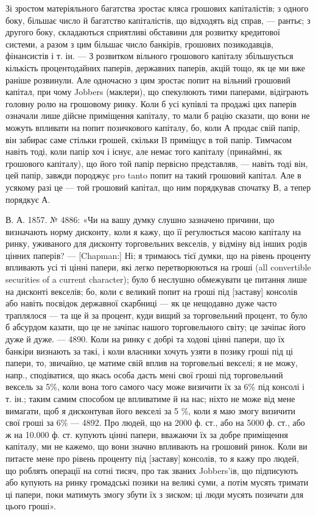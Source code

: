 Зі зростом матеріяльного багатства зростає кляса грошових капіталістів;
з одного боку, більшає число й багатство капіталістів, що відходять від справ, —
рантьє; з другого боку, складаються сприятливі обставини для розвитку кредитової
системи, а разом з цим більшає число банкірів, грошових позикодавців, фінансистів
і т. ін. — З розвитком вільного грошового капіталу збільшується кількість
процентодайних паперів, державних паперів, акцій тощо, як це ми вже раніше
розвинули. Але одночасно з цим зростає попит на вільний грошовий капітал, при
чому Jobbers (маклери), що спекулюють тими паперами, відіграють головну ролю на
грошовому ринку. Коли б усі купівлі та продажі цих паперів означали лише
дійсне приміщення капіталу, то мали б рацію сказати, що вони не можуть
впливати на попит позичкового капіталу, бо, коли А продає свій папір, він
забирає саме стільки грошей, скільки B приміщує в той папір. Тимчасом навіть
тоді, коли папір хоч і існує, але немає того капіталу (принаймні, як грошового
капіталу), що його той папір первісно представляв, — навіть тоді він, цей папір,
завжди породжує pro tanto попит на такий грошовий капітал. Але в усякому
разі це — той грошовий капітал, що ним порядкував спочатку В, а тепер
порядкує А.

В. А. 1857. № 4886: «Чи на вашу думку слушно зазначено причини,
що визначають норму дисконту, коли я кажу, що її регулюється масою капіталу
на ринку, уживаного для дисконту торговельних векселів, у відміну від
інших родів цінних паперів? — [Chapman:] Ні; я тримаюсь тієї думки, що на
рівень проценту впливають усі ті цінні папери, які легко перетворюються
на гроші (all convertible securities of a current character); було б неслушно
обмежувати це питання лише на дисконті векселів; бо, коли є великий попит
на гроші під [заставу] консолів або навіть посвідок державної скарбниці — як
це нещодавно дуже часто траплялося — та ще й за процент, куди вищий за
торговельний процент, то було б абсурдом казати, що це не зачіпає нашого торговельного
світу; це зачіпає його дуже й дуже. — 4890. Коли на ринку є добрі
та ходові цінні папери, що їх банкіри визнають за такі, і коли власники
хочуть узяти в позику гроші під ці папери, то, звичайно, це матиме свій вплив на
торговельні векселі; я не можу, напр., сподіватися, що якась особа дасть мені
свої гроші під торговельний вексель за 5\%, коли вона того самого часу може
визичити їх за 6\% під консолі і т. ін.; таким самим способом це впливатиме й на
нас; ніхто не може від мене вимагати, щоб я дисконтував його векселі за 5 \%,
коли я маю змогу визичити свої гроші за 6\% — 4892. Про людей, що на 2000
ф. ст., або на 5000 ф. ст., або ж на 10.000 ф. ст. купують цінні папери, вважаючи
їх за добре приміщення капіталу, ми не кажемо, що вони значно впливають
на грошовий ринок. Коли ви питаєте мене про рівень проценту під [заставу]
консолів, то я кажу про людей, що роблять операції на сотні тисяч, про так
званих Jobbers’iв, що підписують або купують на ринку громадські позики на
великі суми, а потім мусять тримати ці папери, поки матимуть змогу збути їх
з зиском; ці люди мусять позичати для цього гроші».

